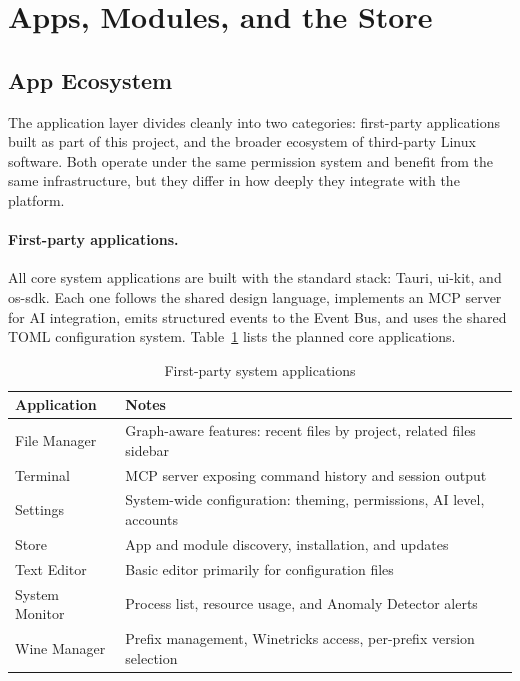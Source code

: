\section{Apps, Modules, and the Store}
\label{sec:apps-modules}

\subsection{App Ecosystem}
\label{sec:app-ecosystem}

The application layer divides cleanly into two categories: first-party
applications built as part of this project, and the broader ecosystem of
third-party Linux software. Both operate under the same permission system and
benefit from the same infrastructure, but they differ in how deeply they
integrate with the platform.

\paragraph{First-party applications.}
All core system applications are built with the standard stack: Tauri, ui-kit,
and os-sdk. Each one follows the shared design language, implements an MCP
server for AI integration, emits structured events to the Event Bus, and uses
the shared TOML configuration system. Table~\ref{tab:first-party} lists the
planned core applications.

\begin{table}[htbp]
\caption{First-party system applications}
\label{tab:first-party}
\begin{tabularx}{\linewidth}{lX}
\toprule
\textbf{Application} & \textbf{Notes} \\
\midrule
File Manager    & Graph-aware features: recent files by project, related files sidebar \\
Terminal        & MCP server exposing command history and session output \\
Settings        & System-wide configuration: theming, permissions, AI level, accounts \\
Store           & App and module discovery, installation, and updates \\
Text Editor     & Basic editor primarily for configuration files \\
System Monitor  & Process list, resource usage, and Anomaly Detector alerts \\
Wine Manager    & Prefix management, Winetricks access, per-prefix version selection \\
\bottomrule
\end{tabularx}
\end{table}


